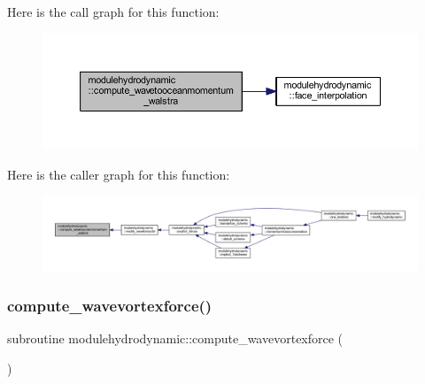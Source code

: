 Here is the call graph for this function\+:\nopagebreak
\begin{figure}[H]
\begin{center}
\leavevmode
\includegraphics[width=350pt]{namespacemodulehydrodynamic_ab36d10de7b5652c6443525b564c85d3b_cgraph}
\end{center}
\end{figure}
Here is the caller graph for this function\+:\nopagebreak
\begin{figure}[H]
\begin{center}
\leavevmode
\includegraphics[width=350pt]{namespacemodulehydrodynamic_ab36d10de7b5652c6443525b564c85d3b_icgraph}
\end{center}
\end{figure}
\mbox{\label{namespacemodulehydrodynamic_a97eb0405fb1ce63e0caa5f1180b47593}} 
\subsubsection{\texorpdfstring{compute\+\_\+wavevortexforce()}{compute\_wavevortexforce()}}
{\footnotesize\ttfamily subroutine modulehydrodynamic\+::compute\+\_\+wavevortexforce (\begin{DoxyParamCaption}{ }\end{DoxyParamCaption})\hspace{0.3cm}{\ttfamily [private]}}

